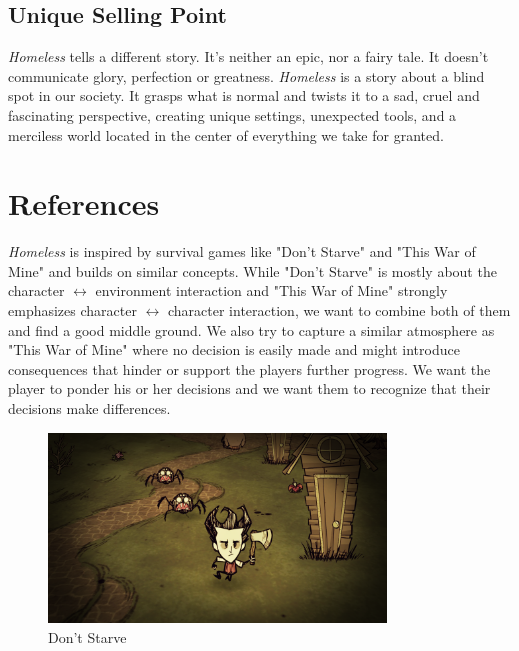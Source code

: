 \documentclass[a4paper]{scrreprt}
\begin{document}
\section{Unique Selling Point}

\textit{Homeless} tells a different story. It's neither an epic, nor a fairy tale. It doesn't communicate glory, perfection or greatness. \textit{Homeless} is a story about a blind spot in our society. It grasps what is normal and twists it to a sad, cruel and fascinating perspective, creating unique settings, unexpected tools, and a merciless world located in the center of everything we take for granted. 



\chapter{References} 
\textit{Homeless} is inspired by survival games like "Don't Starve" and "This War of Mine" and builds on similar concepts. While "Don't Starve" is mostly about the character $\leftrightarrow$ environment interaction and "This War of Mine" strongly emphasizes character $\leftrightarrow$ character interaction, we want to combine both of them and find a good middle ground. We also try to capture a similar atmosphere as "This War of Mine" where no decision is easily made and might introduce consequences that hinder or support the players further progress. We want the player to ponder his or her decisions and we want them to recognize that their decisions make differences.

\begin{figure}[h]
\centering
\includegraphics[width=0.8\textwidth]{dontstarve.png}
\caption{\label{fig:ds} Don't Starve}
\end{figure}
\end{document}

